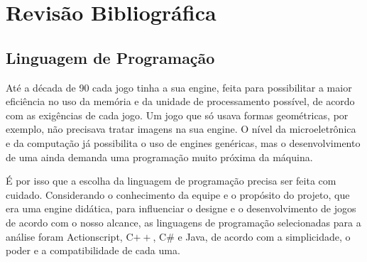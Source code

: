 \documentclass[a4paper,12pt]{report}
\begin{document}
% 
% 
% 
% 
% 
% 

\chapter{Revisão Bibliográfica}
\label{cap:revisao}
%
\section{Linguagem de Programação}
\label{linguagem}
%
Até a década de 90 cada jogo tinha a sua engine, feita para possibilitar a maior eficiência no uso da memória e da unidade de 
processamento possível, de acordo com as exigências de cada jogo. Um jogo que só usava formas geométricas, por exemplo, não precisava 
tratar imagens na sua engine. O nível da microeletrônica e da computação já possibilita o uso de engines genéricas, mas o desenvolvimento 
de uma ainda demanda uma programação muito próxima da máquina. \par
É por isso que a escolha da linguagem de programação precisa ser feita com cuidado. Considerando o conhecimento da equipe e o propósito do 
projeto, que era uma engine didática, para influenciar o designe e o desenvolvimento de jogos de acordo com o nosso alcance, as linguagens 
de programação selecionadas para a análise foram Actionscript, C$++$, C\# e Java, de acordo com a simplicidade, o poder e a compatibilidade 
de cada uma.
%
\end{document}
